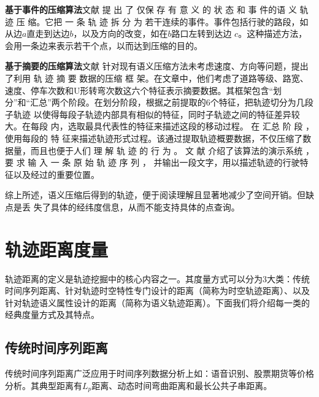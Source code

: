\textbf{基于事件的压缩算法}文献\cite{Sementick,RichterSL12} 提 出 了 仅保 存 有 意 义 的 状 态 和 事 件的语 义 轨 迹 压 缩。它把 一 条 轨 迹 拆 分 为 若干连续的事件。事件包括行驶的路段，如从边$a$直走到达边$b$，以及方向的改变，如在$b$路口左转到达边 $c$。这种描述方法，会用一条边来表示若干个点，以而达到压缩的目的。


\textbf{基于摘要的压缩算法}文献\cite{STMaker} 针对现有语义压缩方法未考虑速度、方向等问题，提出了利用 轨 迹 摘 要 数据的压缩 框 架。在文章中，他们考虑了道路等级、路宽、速度、停车次数和U形转弯次数这六个特征表示摘要数据。其框架包含``划分''和``汇总''两个阶段。在划分阶段，根据之前提取的6个特征，把轨迹切分为几段 子轨迹 以使得每段子轨迹内部具有相似的特征，同时子轨迹之间的特征差异较大。在每段 内，选取最具代表性的特征来描述这段的移动过程。
在 汇总 阶 段 ，使用每段的 特 征来描述轨迹形式过程。该通过提取轨迹概要数据，不仅压缩了数据量，而且也便于人们 理 解 轨 迹 的 行 为 。
文 献 \cite{Makesense}介绍了该算法的演示系统 ，要 求 输 入 一 条 原 始 轨 迹 序 列 ， 并输出一段文字，用以描述轨迹的行驶特征以及经过的重要位置。

综上所述，语义压缩后得到的轨迹，便于阅读理解且显著地减少了空间开销。但缺点是丢 失了具体的经纬度信息，从而不能支持具体的点查询。



\section{轨迹距离度量}\label{sec-c2-measures}
轨迹距离的定义是轨迹挖掘中的核心内容之一。其度量方式可以分为3大类：传统时间序列距离、针对轨迹时空特性专门设计的距离（简称为时空轨迹距离）、以及针对轨迹语义属性设计的距离（简称为语义轨迹距离）。下面我们将介绍每一类的经典度量方式及其特点。

\subsection{传统时间序列距离}
传统时间序列距离广泛应用于时间序列数据分析上如：语音识别、股票期货等价格分析。其典型距离有$L_{p}$距离、动态时间弯曲距离和最长公共子串距离。

